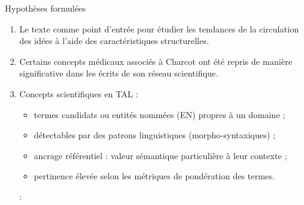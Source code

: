 \begin{frame}{Hypothèses formulées}
	\begin{enumerate}
		\item 	Le texte comme point d'entrée pour étudier les tendances de la circulation des idées à l'aide des caractéristiques structurelles.
			\begin{flushright}
			\small
			\parencite[p.~2]{milia2023}
		\end{flushright}
		
		\item Certains concepts médicaux associés à Charcot ont été repris de manière significative dans les écrits de son réseau scientifique.
	
	\item 	Concepts scientifiques en \textsc{TAL} :
		\begin{itemize}
			\item termes candidats ou entités nommées (\textsc{EN}) propres à un domaine ;
			\item détectables par des patrons linguistiques (morpho-syntaxiques) ;
			\item ancrage référentiel : valeur sémantique particulière à leur contexte ;
			\item pertinence élevée selon les métriques de pondération des termes.
		\end{itemize}		
		\begin{flushright}
			\small
			\citep[pp.~1-2]{omrane2011poids}: 
		\end{flushright}		
	\end{enumerate}

	
%
\end{frame}

